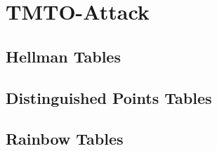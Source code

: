 \chapter{TMTO-Attack}

\section{Hellman Tables}

\section{Distinguished Points Tables}

\section{Rainbow Tables}
